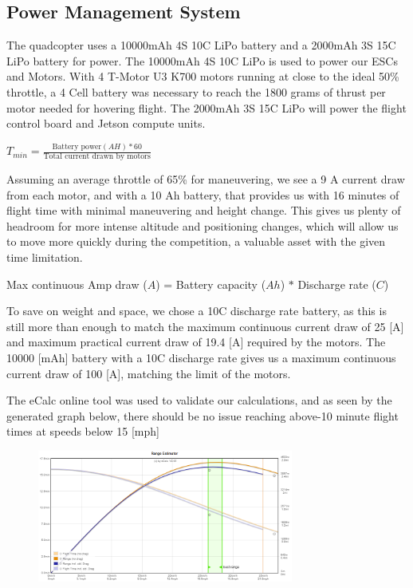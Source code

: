 \documentclass[12pt,letterpaper]{article}
\begin{document}
	\subsection*{Power Management System}
		The quadcopter uses a 10000mAh 4S 10C LiPo battery and a 2000mAh 3S 15C LiPo battery for power. The 10000mAh 4S 10C LiPo is used to power our ESCs and Motors. With 4 T-Motor U3 K700 motors running at close to the ideal 50\% throttle, a 4 Cell battery was necessary to reach the 1800 grams of thrust per motor needed for hovering flight. The 2000mAh 3S 15C LiPo will power the flight control board and Jetson compute units.
		\begin{center}
			$T_{min} = \frac{\text{Battery power}(AH) * 60}{\text{Total current drawn by motors}}$
		\end{center}

		Assuming an average throttle of 65\% for maneuvering, we see a 9 A current draw from each motor, and with a 10 Ah battery, that provides us with 16 minutes of flight time with minimal maneuvering and height change. This gives us plenty of headroom for more intense altitude and positioning changes, which will allow us to move more quickly during the competition, a valuable asset with the given time limitation.
		\begin{center}
			Max continuous Amp draw ($A$) = Battery capacity ($Ah$) $*$ Discharge rate ($C$)
		\end{center}

		To save on weight and space, we chose a 10C discharge rate battery, as this is still more than enough to match the maximum continuous current draw of 25 [A] and maximum practical current draw of 19.4 [A] required by the motors. The 10000 [mAh] battery with a 10C discharge rate gives us a maximum continuous current draw of 100 [A], matching the limit of the motors.

		The eCalc online tool was used to validate our calculations, and as seen by the generated graph below, there should be no issue reaching above-10 minute flight times at speeds below 15 [mph]

		\begin{figure}[!htbp]
			\begin{center}
				\includegraphics[width=0.75\textwidth]{powerGraph}
			\end{center}
		\end{figure}
\end{document}
